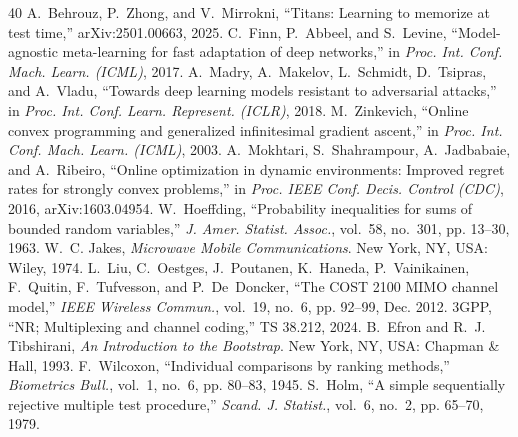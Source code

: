 \documentclass[journal]{IEEEtran}
\begin{document}
\begin{thebibliography}{40}
 A.~Behrouz, P.~Zhong, and V.~Mirrokni, ``Titans: Learning to memorize at test time,'' arXiv:2501.00663, 2025.
 C.~Finn, P.~Abbeel, and S.~Levine, ``Model-agnostic meta-learning for fast adaptation of deep networks,'' in \emph{Proc. Int. Conf. Mach. Learn. (ICML)}, 2017.
 A.~Madry, A.~Makelov, L.~Schmidt, D.~Tsipras, and A.~Vladu, ``Towards deep learning models resistant to adversarial attacks,'' in \emph{Proc. Int. Conf. Learn. Represent. (ICLR)}, 2018.
 M.~Zinkevich, ``Online convex programming and generalized infinitesimal gradient ascent,'' in \emph{Proc. Int. Conf. Mach. Learn. (ICML)}, 2003.
 A.~Mokhtari, S.~Shahrampour, A.~Jadbabaie, and A.~Ribeiro, ``Online optimization in dynamic environments: Improved regret rates for strongly convex problems,'' in \emph{Proc. IEEE Conf. Decis. Control (CDC)}, 2016, arXiv:1603.04954.
 W.~Hoeffding, ``Probability inequalities for sums of bounded random variables,'' \emph{J. Amer. Statist. Assoc.}, vol.~58, no.~301, pp. 13--30, 1963.
 W.~C. Jakes, \emph{Microwave Mobile Communications}. New York, NY, USA: Wiley, 1974.
 L.~Liu, C.~Oestges, J.~Poutanen, K.~Haneda, P.~Vainikainen, F.~Quitin, F.~Tufvesson, and P.~De~Doncker, ``The COST 2100 MIMO channel model,'' \emph{IEEE Wireless Commun.}, vol.~19, no.~6, pp. 92--99, Dec. 2012.
 3GPP, ``NR; Multiplexing and channel coding,'' TS 38.212, 2024.
 B.~Efron and R.~J. Tibshirani, \emph{An Introduction to the Bootstrap}. New York, NY, USA: Chapman \& Hall, 1993.
 F.~Wilcoxon, ``Individual comparisons by ranking methods,'' \emph{Biometrics Bull.}, vol.~1, no.~6, pp. 80--83, 1945.
 S.~Holm, ``A simple sequentially rejective multiple test procedure,'' \emph{Scand. J. Statist.}, vol.~6, no.~2, pp. 65--70, 1979.
\end{thebibliography}
\end{document}
